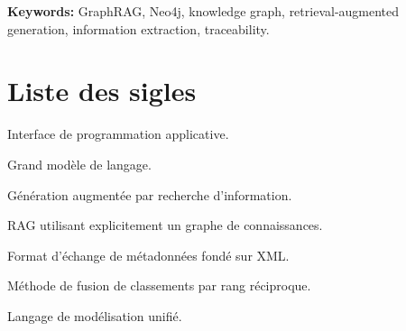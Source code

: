 \textbf{Keywords:} GraphRAG, Neo4j, knowledge graph, retrieval-augmented generation, information extraction, traceability.

\chapter*{Liste des sigles}
\begin{description}[leftmargin=3.5cm,style=nextline]
  \item[API] Interface de programmation applicative.
  \item[LLM] Grand modèle de langage.
  \item[RAG] Génération augmentée par recherche d'information.
  \item[GraphRAG] RAG utilisant explicitement un graphe de connaissances.
  \item[XMI] Format d'échange de métadonnées fondé sur XML.
  \item[RRF] Méthode de fusion de classements par rang réciproque.
  \item[UML] Langage de modélisation unifié.
\end{description}
